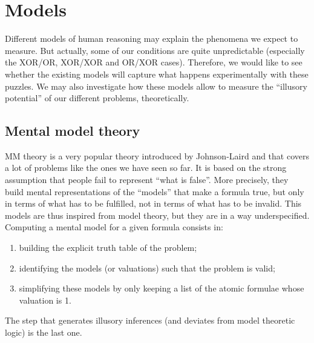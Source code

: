 \documentclass[french]{article}
\begin{document}
\section{Models}
Different models of human reasoning may explain the phenomena we expect to measure. But actually, some of our conditions are quite unpredictable (especially the XOR/OR, XOR/XOR and OR/XOR cases). Therefore, we would like to see whether the existing models will capture what happens experimentally with these puzzles. We may also investigate how these models allow to measure the ``illusory potential'' of our different problems, theoretically.
\subsection{Mental model theory}
MM theory is a very popular theory introduced by Johnson-Laird and that covers a lot of problems like the ones we have seen so far. It is based on the strong assumption that people fail to represent ``what is false''. More precisely, they build mental representations of the ``models'' that make a formula true, but only in terms of what has to be fulfilled, not in terms of what has to be invalid. This models are thus inspired from model theory, but they are in a way underspecified. Computing a mental model for a given formula consists in:
\begin{enumerate}[label=(\roman*)]
	\item building the explicit truth table of the problem;
	\item identifying the models (or valuations) such that the problem is valid;
	\item simplifying these models by only keeping a list of the atomic formulae whose valuation is 1.
\end{enumerate}
The step that generates illusory inferences (and deviates from model theoretic logic) is the last one.
\end{document}
